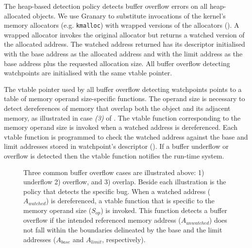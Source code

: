 \documentclass[letterpaper,twocolumn,10pt]{article}
\let\ORIGcaption\caption
\renewcommand{\caption}[2][\compressedcaption]{%
\def\compressedcaption{#2}%
    \vspace{-12pt}%
    \ORIGcaption[#1]{#2}}
\newcommand{\comment}[1]{}
\begin{document}
The heap-based detection policy detects buffer overflow errors on all heap-allocated objects. We use Granary to substitute invocations of the kernel's memory allocators (e.g. \texttt{kmalloc}) with wrapped versions of the allocators (). A wrapped allocator invokes the original allocator but returns a watched version of the allocated address. The watched address returned has its descriptor initialised with the base address as the allocated address and with the limit address as the base address plus the requested allocation size. All buffer overflow detecting watchpoints are initialised with the same vtable pointer.


The vtable pointer used by all buffer overflow detecting watchpoints points to a table of memory operand size-specific functions. The operand size is necessary to detect dereferences of memory that overlap both the object and its adjacent memory, as illustrated in case \emph{(3)} of . The vtable function corresponding to the memory operand size is invoked when a watched address is dereferenced. Each vtable function is programmed to check the watched address against the base and limit addresses stored in watchpoint's descriptor (). If a buffer underflow or overflow is detected then the vtable function notifies the run-time system.

\begin{figure}
\abovedisplayskip=0pt
\belowdisplayskip=0pt
\begin{center}
\end{center}
\iffalse
	\abovedisplayskip=0pt
	\belowdisplayskip=0pt
	\begin{align*}
		A_{base}  & > {A_{unwatched}} \tag{Underflow} \\
		A_{limit} & \leq {A_{unwatched}} \tag{Overflow} \\
		A_{limit} & < {A_{unwatched}} + S_{op} \tag{Overlap}
	\end{align*}
\fi
\caption[Caption for LOF]{\label{fig:detect_overflow}Three common buffer overflow cases are illustrated above: 1) underflow 2) overflow, and 3) overlap. Beside each illustration is the policy that detects the specific bug. When a watched address ($A_{watched}$) is dereferenced, a vtable function that is specific to the memory operand size ($S_{op}$) is invoked. This function detects a buffer overflow if the intended referenced memory address ($A_{unwatched}$) does not fall within the boundaries delineated by the base and the limit addresses ($A_{base}$ and $A_{limit}$, respectively).}
\end{figure}
\end{document}
